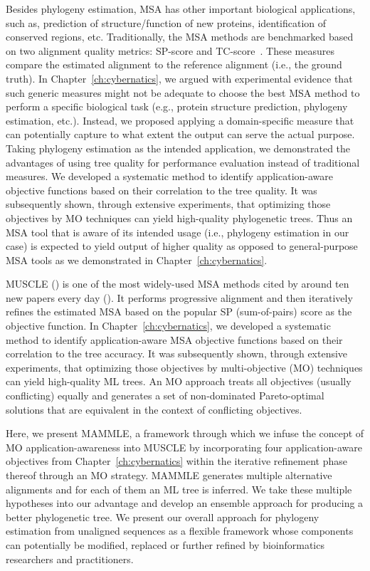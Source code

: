Besides phylogeny estimation, MSA has other important biological applications, such as, prediction of structure/function of new proteins, identification of conserved regions, etc. Traditionally, the MSA methods are benchmarked based on two alignment quality metrics: SP-score and TC-score~\cite{warnow2017computational}. These measures compare the estimated alignment to the reference alignment (i.e., the ground truth). In Chapter~\ref{ch:cybernatics}, we argued with experimental evidence that such generic measures might not be adequate to choose the best MSA method to perform a specific biological task (e.g., protein structure prediction, phylogeny estimation, etc.). Instead, we proposed applying a domain-specific measure that can potentially capture to what extent the output can serve the actual purpose. Taking phylogeny estimation as the intended application, we demonstrated the advantages of using tree quality for performance evaluation instead of traditional measures. We developed a systematic method to identify application-aware objective functions based on their correlation to the tree quality. It was subsequently shown, through extensive experiments, that optimizing those objectives by MO techniques can yield high-quality phylogenetic trees. Thus an MSA tool that is aware of its intended usage (i.e., phylogeny estimation in our case) is expected to yield output of higher quality as opposed to general-purpose MSA tools as we demonstrated in Chapter~\ref{ch:cybernatics}. 

MUSCLE (\cite{edgar2004muscle}) is one of the most widely-used MSA methods cited by around ten new papers every day (\cite{muscle-web}). It performs progressive alignment and then iteratively refines the estimated MSA based on the popular SP (sum-of-pairs) score as the objective function. In Chapter~\ref{ch:cybernatics}, we developed a systematic method to identify application-aware MSA objective functions based on their correlation to the tree accuracy. It was subsequently shown, through extensive experiments, that optimizing those objectives by multi-objective (MO) techniques can yield high-quality ML trees. An MO approach treats all objectives (usually conflicting) equally and generates a set of non-dominated Pareto-optimal solutions that are equivalent in the context of conflicting objectives. 

Here, we present MAMMLE, a framework through which we infuse the concept of MO application-awareness into MUSCLE by incorporating four application-aware objectives from Chapter~\ref{ch:cybernatics} within the iterative refinement phase thereof through an MO strategy. MAMMLE generates multiple alternative alignments and for each of them an ML tree is inferred. We take these multiple hypotheses into our advantage and develop an ensemble approach for producing a better phylogenetic tree. We present our overall approach for phylogeny estimation from unaligned sequences as a flexible framework whose components can potentially be modified, replaced or further refined by bioinformatics researchers and practitioners.

